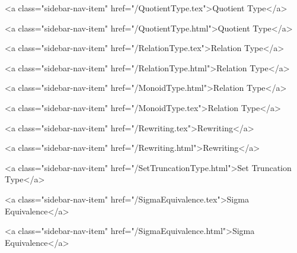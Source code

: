       
        
          <a class="sidebar-nav-item" href="/QuotientType.tex">Quotient Type</a>
        
      
    
      
        
          <a class="sidebar-nav-item" href="/QuotientType.html">Quotient Type</a>
        
      
    
      
        
          <a class="sidebar-nav-item" href="/RelationType.tex">Relation Type</a>
        
      
    
      
        
          <a class="sidebar-nav-item" href="/RelationType.html">Relation Type</a>
        
      
    
      
        
          <a class="sidebar-nav-item" href="/MonoidType.html">Relation Type</a>
        
      
    
      
        
          <a class="sidebar-nav-item" href="/MonoidType.tex">Relation Type</a>
        
      
    
      
        
          <a class="sidebar-nav-item" href="/Rewriting.tex">Rewriting</a>
        
      
    
      
        
          <a class="sidebar-nav-item" href="/Rewriting.html">Rewriting</a>
        
      
    
      
        
          <a class="sidebar-nav-item" href="/SetTruncationType.html">Set Truncation Type</a>
        
      
    
      
        
          <a class="sidebar-nav-item" href="/SigmaEquivalence.tex">Sigma Equivalence</a>
        
      
    
      
        
          <a class="sidebar-nav-item" href="/SigmaEquivalence.html">Sigma Equivalence</a>
        
      
    
